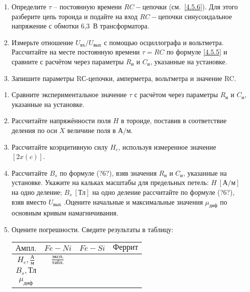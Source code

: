 \begin{lab:task}
\begin{enumerate}
\item
Определите $\tau$ -- постоянную времени $RC-$цепочки (см.~\eqref{4.5.6}). Для этого
разберите цепь тороида и подайте на вход $RC-$цепочки синусоидальное напряжение с обмотки 6,3~В трансформатора.

\item
Измерьте отношение $U_\text{вх} / U_\text{вых}$ с помощью осциллографа и вольтметра. Рассчитайте на месте постоянную времени $\tau=RC$ по формуле \eqref{4.5.5} и сравните с расчётом через параметры $R_\text{и}$ и $C_\text{и}$, указанные на установке.

\item
Запишите параметры RС-цепочки, амперметра, вольтметра и значе­ние RC.
\end{enumerate}

\begin{enumerate}
\item
Сравните экспериментальное значение $\tau$ с расчётом через параметры $R_\text{и}$ и $C_\text{и}$, указанные на установке.

\item
Рассчитайте напряжённости поля $H$ в тороиде, поставив в соответствие деления по оси $X$ величине поля в $\text{А} / \text{м}$.

\item
Рассчитайте коэрцитивную силу $H_c$, используя измеренное значение $[2x(c)]$.

\item
Рассчитайте $B_s$ по формуле (?6?),
взяв значения $R_\text{и}$ и $C_\text{и}$, указанные на установке. Укажите на кальках масштабы для предельных петель: $H~[\text{А} / \text{м}]$ на одно деление; $B_s~[\text{Тл}]$ на одно деление рассчитайте по формуле (?6?), взяв вместо $U_\text{вых}$ .Оцените начальные и максимальные значения $\mu_\text{диф}$ по основным кривым намагничивания.

\item
Оцените погрешности. Сведите результаты в таблицу:
\begin{center}
\begin{tabular}{|c|c|c|c|}
\hline
$\text{Ампл.}$ & $Fe-Ni$ & $Fe-Si$ & $\text{Феррит}$ \\
\hline
$H_c, \frac{\text{А}}{\text{м}}$ & $\frac{\text{эксп.}}{\text{табл.}}$ & & \\
$B_s, \text{Тл}$ & & & \\
$\mu_\text{диф}$ & & & \\
\hline
\end{tabular}
\end{center}

\end{enumerate}
\end{lab:task}


